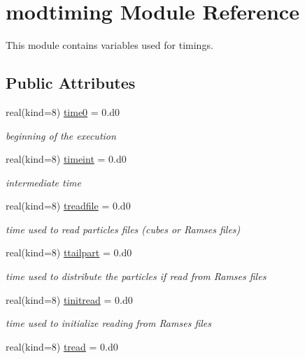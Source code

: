 \hypertarget{classmodtiming}{\section{modtiming Module Reference}
\label{classmodtiming}
}


This module contains variables used for timings.  


\subsection*{Public Attributes}
\begin{DoxyCompactItemize}
\item 
real(kind=8) \hyperlink{classmodtiming_aa15cbf8a08e28c5209481b3ed5f11090}{time0} = 0.d0
\begin{DoxyCompactList}\small\item\em beginning of the execution \end{DoxyCompactList}\item 
real(kind=8) \hyperlink{classmodtiming_a724cb127b8168bf0645e4070d83a34c0}{timeint} = 0.d0
\begin{DoxyCompactList}\small\item\em intermediate time \end{DoxyCompactList}\item 
real(kind=8) \hyperlink{classmodtiming_ab585192644ed79fc1030fde80dd84f85}{treadfile} = 0.d0
\begin{DoxyCompactList}\small\item\em time used to read particles files (cubes or Ramses files) \end{DoxyCompactList}\item 
real(kind=8) \hyperlink{classmodtiming_a65a8925f0685c0a5c5e42b0afd3b4a69}{ttailpart} = 0.d0
\begin{DoxyCompactList}\small\item\em time used to distribute the particles if read from Ramses files \end{DoxyCompactList}\item 
real(kind=8) \hyperlink{classmodtiming_a6c37469e0c299e5eb7c4b21eec1f2405}{tinitread} = 0.d0
\begin{DoxyCompactList}\small\item\em time used to initialize reading from Ramses files \end{DoxyCompactList}\item 
real(kind=8) \hyperlink{classmodtiming_ab77d3fc2a7e3da662677204c1c8f7e84}{tread} = 0.d0

\end{DoxyCompactItemize}
